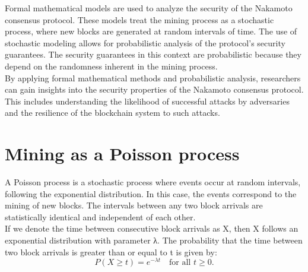 \documentclass{report}
\begin{document}
Formal mathematical models are used to analyze the security of the Nakamoto consensus protocol. These models treat the mining process as a stochastic process, where new blocks are generated at random intervals of time. The use of stochastic modeling allows for probabilistic analysis of the protocol's security guarantees. The security guarantees in this context are probabilistic because they depend on the randomness inherent in the mining process.\\
By applying formal mathematical methods and probabilistic analysis, researchers can gain insights into the security properties of the Nakamoto consensus protocol. This includes understanding the likelihood of successful attacks by adversaries and the resilience of the blockchain system to such attacks.

\section{Mining as a Poisson process}
A Poisson process is a stochastic process where events occur at random intervals, following the exponential distribution. In this case, the events correspond to the mining of new blocks. The intervals between any two block arrivals are statistically identical and independent of each other.\\
If we denote the time between consecutive block arrivals as X, then X follows an exponential distribution with parameter λ. The probability that the time between two block arrivals is greater than or equal to t is given by:\\
$$ P(X \geq t) = e^{-\lambda t} \quad \text{for all } t \geq 0. $$
\end{document}

